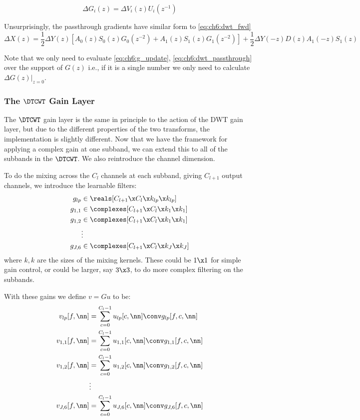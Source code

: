 \begin{equation}
  \Delta G_i(z) = \Delta V_i(z) U_i(z^{-1}) \label{eq:ch6:g_update}
\end{equation}

Unsurprisingly, the passthrough gradients have similar form to \eqref{eq:ch6:dwt_fwd}
\begin{equation}
  \Delta X(z) = \frac{1}{2} \Delta Y(z) \left[A_0(z)S_0(z)G_0(z^{-2}) + A_1(z)S_1(z)G_1(z^{-2}) \right] + 
         \frac{1}{2}\Delta Y(-z)D(z)A_1(-z)S_1(z) \label{eq:ch6:dwt_passthrough}
\end{equation}

Note that we only need to evaluate \eqref{eq:ch6:g_update},
\eqref{eq:ch6:dwt_passthrough} over the support of $G(z)$ i.e., if it is a
single number we only need to calculate $\left.\Delta G(z)\right\rvert_{z=0}$.


 
\subsubsection{The $\DTCWT$ Gain Layer}

The $\DTCWT$ gain layer is the same in principle to the action of the DWT gain
layer, but due to the different properties of the two transforms, the
implementation is slightly different. 
Now that we have the framework for applying a complex gain at one subband, we
can extend this to all of the subbands in the $\DTCWT$. We also reintroduce the channel
dimension. 

To do the mixing across the $C_l$ channels at each subband, giving $C_{l+1}$
output channels, we introduce the learnable filters:
%
\begin{align}
  g_{lp} &\in \reals[C_{l+1}\x C_l\x k_{lp}\x k_{lp}] \label{eq:ch6:glp} \\
  g_{1,1} &\in \complexes[C_{l+1}\x C_l\x k_1\x k_1] \\
  g_{1,2} &\in \complexes[C_{l+1}\x C_l\x k_1\x k_1] \\
      & \vdots \nonumber \\
  g_{J,6} &\in \complexes[C_{l+1}\x C_l\x k_J\x k_J]  \label{eq:ch6:gj6}
\end{align}
%
where $k, k$ are the sizes of the mixing kernels. These could be $1\x 1$ for
simple gain control, or could be larger, say $3\x 3$, to do more complex
filtering on the subbands. 

With these gains we define $v = Gu$ to be:
\begin{align}
  v_{lp}[f, \nn] &=  \sum_{c=0}^{C_l-1} u_{lp}[c, \nn] \conv g_{lp}[f, c, \nn] \\
  v_{1,1}[f, \nn] &=  \sum_{c=0}^{C_l-1} u_{1,1}[c, \nn] \conv g_{1,1}[f, c, \nn] \\
  v_{1,2}[f, \nn] &=  \sum_{c=0}^{C_l-1} u_{1,2}[c, \nn] \conv g_{1,2}[f, c, \nn] \\
                  & \vdots \nonumber \\
  v_{J,6}[f, \nn] &=  \sum_{c=0}^{C_l-1} u_{J,6}[c, \nn] \conv g_{J,6}[f, c, \nn] 
\end{align}

